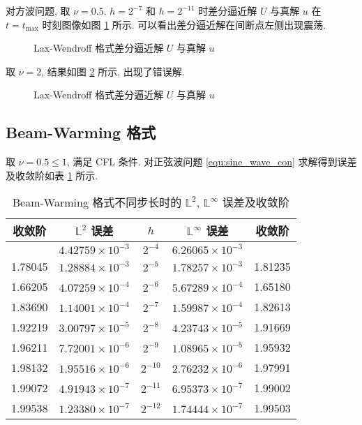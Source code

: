 \documentclass[UTF8, a4paper, 12pt, oneside, onecolumn]{article}
\begin{document}
对方波问题, 取 $\nu = 0.5$. $h = 2^{-7}$ 和 $h = 2^{-11}$ 时差分逼近解 $U$ 与真解 $u$ 在 $t = t_{\max }$ 时刻图像如图 \ref{fig:lax_wendroff_square_Uu} 所示. 可以看出差分逼近解在间断点左侧出现震荡.

\begin{figure}[H]\centering{}
	\resizebox{0.4\linewidth}{!}{}\quad
	\resizebox{0.4\linewidth}{!}{}
	\caption{Lax-Wendroff 格式差分逼近解 $U$ 与真解 $u$}\label{fig:lax_wendroff_square_Uu}
\end{figure}

取 $\nu = 2$, 结果如图 \ref{fig:lax_wendroff_square_Uu_noCFL} 所示, 出现了错误解.

\begin{figure}[H]\centering{}
	\resizebox{0.4\linewidth}{!}{}\quad
	\resizebox{0.4\linewidth}{!}{}
	\caption{Lax-Wendroff 格式差分逼近解 $U$ 与真解 $u$}\label{fig:lax_wendroff_square_Uu_noCFL}
\end{figure}

\subsection{Beam-Warming 格式}

取 $\nu = 0.5 \leq 1$, 满足 CFL 条件. 对正弦波问题 \eqref{equ:sine_wave_con} 求解得到误差及收敛阶如表 \ref{tab:beam_warming_err} 所示.

\begin{table}[H]\centering\heiti{}
	\caption{Beam-Warming 格式不同步长时的 $\mathbb{L}^2$, $\mathbb{L}^\infty$ 误差及收敛阶}\label{tab:beam_warming_err}
	\begin{tabular}{|c|c|c|c|c|}\hline
		收敛阶	&	$\mathbb{L}^2$ 误差	&	$h$	&	$\mathbb{L}^\infty$ 误差		&	收敛阶\\\hline
				&	$4.42759 \times 10^{-3}$	&	$2^{-4}$	&	$6.26065 \times 10^{-3}$	&		   \\\hline
		1.78045	&	$1.28884 \times 10^{-3}$	&	$2^{-5}$	&	$1.78257 \times 10^{-3}$	&	1.81235\\\hline
		1.66205	&	$4.07259 \times 10^{-4}$	&	$2^{-6}$	&	$5.67289 \times 10^{-4}$	&	1.65180\\\hline
		1.83690	&	$1.14001 \times 10^{-4}$	&	$2^{-7}$	&	$1.59987 \times 10^{-4}$	&	1.82613\\\hline
		1.92219	&	$3.00797 \times 10^{-5}$	&	$2^{-8}$	&	$4.23743 \times 10^{-5}$	&	1.91669\\\hline
		1.96211	&	$7.72001 \times 10^{-6}$	&	$2^{-9}$	&	$1.08965 \times 10^{-5}$	&	1.95932\\\hline
		1.98132	&	$1.95516 \times 10^{-6}$	&	$2^{-10}$	&	$2.76232 \times 10^{-6}$	&	1.97991\\\hline
		1.99072	&	$4.91943 \times 10^{-7}$	&	$2^{-11}$	&	$6.95373 \times 10^{-7}$	&	1.99002\\\hline
		1.99538	&	$1.23380 \times 10^{-7}$	&	$2^{-12}$	&	$1.74444 \times 10^{-7}$	&	1.99503\\\hline
	\end{tabular}
\end{table}
\end{document}
